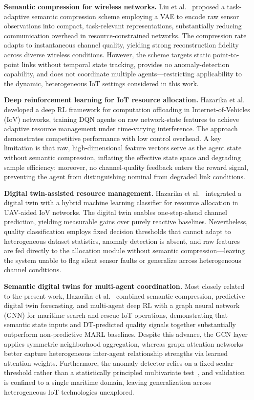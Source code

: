 \documentclass[conference]{IEEEtran}
\begin{document}
\textbf{Semantic compression for wireless networks.}
Liu et al.~\cite{ref_vae_wireless} proposed a task-adaptive semantic
compression scheme employing a VAE to encode raw sensor observations into
compact, task-relevant representations, substantially reducing communication
overhead in resource-constrained networks. The compression rate adapts to
instantaneous channel quality, yielding strong reconstruction fidelity across
diverse wireless conditions. However, the scheme targets static point-to-point
links without temporal state tracking, provides no anomaly-detection
capability, and does not coordinate multiple agents---restricting applicability
to the dynamic, heterogeneous IoT settings considered in this work.

\textbf{Deep reinforcement learning for IoT resource allocation.}
Hazarika et al.~\cite{ref_marl_wireless} developed a deep RL framework for
computation offloading in Internet-of-Vehicles (IoV) networks, training DQN
agents on raw network-state features to achieve adaptive resource management
under time-varying interference. The approach demonstrates competitive
performance with low control overhead. A key limitation is that raw,
high-dimensional feature vectors serve as the agent state without semantic
compression, inflating the effective state space and degrading sample
efficiency; moreover, no channel-quality feedback enters the reward signal,
preventing the agent from distinguishing nominal from degraded link conditions.

\textbf{Digital twin-assisted resource management.}
Hazarika et al.~\cite{ref_dt_uav} integrated a digital twin with a hybrid
machine learning classifier for resource allocation in UAV-aided IoV networks.
The digital twin enables one-step-ahead channel prediction, yielding
measurable gains over purely reactive baselines. Nevertheless, quality
classification employs fixed decision thresholds that cannot adapt to
heterogeneous dataset statistics, anomaly detection is absent, and raw
features are fed directly to the allocation module without semantic
compression---leaving the system unable to flag silent sensor faults or
generalize across heterogeneous channel conditions.

\textbf{Semantic digital twins for multi-agent coordination.}
Most closely related to the present work, Hazarika et al.~\cite{ref_semadt}
combined semantic compression, predictive digital twin forecasting, and
multi-agent deep RL with a graph neural network (GNN) for maritime
search-and-rescue IoT operations, demonstrating that semantic state inputs
and DT-predicted quality signals together substantially outperform
non-predictive MARL baselines. Despite this advance, the GCN layer applies
symmetric neighborhood aggregation, whereas graph attention
networks~\cite{ref_gat_comm} better capture heterogeneous inter-agent
relationship strengths via learned attention weights. Furthermore, the anomaly
detector relies on a fixed scalar threshold rather than a statistically
principled multivariate test~\cite{ref_anomaly_survey,ref_lof}, and
validation is confined to a single maritime domain, leaving generalization
across heterogeneous IoT technologies unexplored.
\end{document}
